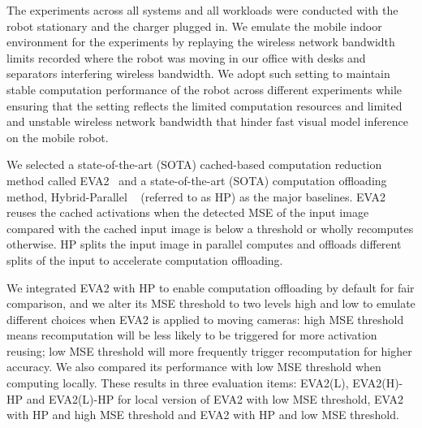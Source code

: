 The experiments across all systems and all workloads were conducted with the robot stationary and the charger plugged in.
We emulate the mobile indoor environment for the experiments by replaying the wireless network bandwidth limits recorded where the robot was moving in our office with desks and separators interfering wireless bandwidth.
We adopt such setting to maintain stable computation performance of the robot across different experiments while ensuring that the setting reflects the limited computation resources and limited and unstable wireless network bandwidth that hinder fast visual model inference on the mobile robot.

We selected a state-of-the-art (SOTA) cached-based computation reduction method called EVA2~\cite{buckler_eva_2018} and a state-of-the-art (SOTA) computation offloading method, Hybrid-Parallel ~\cite{sun2024hybridparallel} (referred to as HP) as the major baselines.
EVA2 reuses the cached activations when the detected MSE of the input image compared with the cached input image is below a threshold or wholly recomputes otherwise.
HP splits the input image in parallel computes and offloads different splits of the input to accelerate computation offloading.

We integrated EVA2 with HP to enable computation offloading by default for fair comparison, and we alter its MSE threshold to two levels high and low to emulate different choices when EVA2 is applied to moving cameras: high MSE threshold means recomputation will be less likely to be triggered for more activation reusing; low MSE threshold will more frequently trigger recomputation for higher accuracy. 
We also compared its performance with low MSE threshold when computing locally.
These results in three evaluation items: EVA2(L), EVA2(H)-HP and EVA2(L)-HP for local version of EVA2 with low MSE threshold, EVA2 with HP and high MSE threshold and EVA2 with HP and low MSE threshold.

